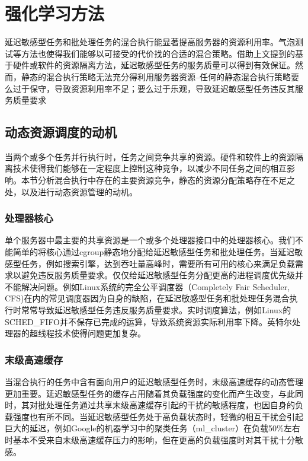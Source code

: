 \chapter{强化学习方法}
延迟敏感型任务和批处理任务的混合执行能显著提高服务器的资源利用率。气泡测试等方法也使得我们能够以可接受的代价找的合适的混合策略。借助上文提到的基于硬件或软件的资源隔离方法，延迟敏感型任务的服务质量可以得到有效保证。然而，静态的混合执行策略无法充分得利用服务器资源\---任何的静态混合执行策略要么过于保守，导致资源利用率不足；要么过于乐观，导致延迟敏感型任务违反其服务质量要求\cite{lo2015heracles}
\section{动态资源调度的动机}
当两个或多个任务并行执行时，任务之间竞争共享的资源。硬件和软件上的资源隔离技术使得我们能够在一定程度上控制这种竞争，以减少不同任务之间的相互影响。本节分析混合执行中存在的主要资源竞争，静态的资源分配策略存在不足之处，以及进行动态资源管理的动机。

\subsection{处理器核心}
单个服务器中最主要的共享资源是一个或多个处理器接口中的处理器核心。我们不能简单的将核心通过cgroup静态地分配给延迟敏感型任务和批处理任务。当延迟敏感型任务，例如搜索引擎，达到吞吐量高峰时，需要所有可用的核心来满足负载需求以避免违反服务质量要求。仅仅给延迟敏感型任务分配更高的进程调度优先级并不能解决问题。例如Linux系统的完全公平调度器（Completely Fair Scheduler, CFS)在内的常见调度器因为自身的缺陷，在延迟敏感型任务和批处理任务混合执行时常常导致延迟敏感型任务违反服务质量要求\cite{leverich2014reconciling}。实时调度算法，例如Linux的SCHED\_FIFO并不保存已完成的运算，导致系统资源实际利用率下降。英特尔处理器的超线程技术使得问题更加复杂。

\subsection{末级高速缓存}

当混合执行的任务中含有面向用户的延迟敏感型任务时，末级高速缓存的动态管理更加重要。延迟敏感型任务的缓存占用随着其负载强度的变化而产生改变\cite{leverich2014reconciling}，与此同时，其对批处理任务通过共享末级高速缓存引起的干扰的敏感程度，也因自身的负载强度也有所不同。当延迟敏感型任务处于高负载状态时，轻微的相互干扰会引起巨大的延迟\cite{kasture2014ubik}，例如Google的机器学习中的聚类任务（ml\_cluster）在负载50\%左右时基本不受来自末级高速缓存压力的影响，但在更高的负载强度时对其干扰十分敏感\cite{lo2015heracles}。

